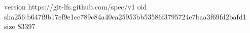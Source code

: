 version https://git-lfs.github.com/spec/v1
oid sha256:b647f9b17ef9e1ce789c84a40ca25953bb53586f3795724e7baa3f69fd2bafd1
size 83397
